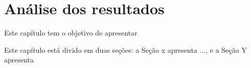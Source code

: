 \section{Análise dos resultados}

Este capítulo tem o objetivo de apresentar 

Este capítulo está divido em duas seções: a Seção x apresenta ..., e a Seção Y apresenta 